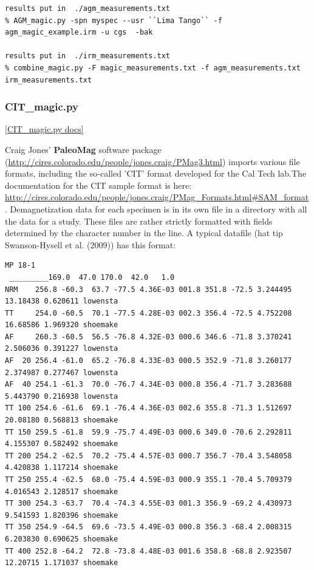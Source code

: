 \documentclass[11pt]{book}
\begin{document}
{{\begin{verbatim}
results put in  ./agm_measurements.txt
% AGM_magic.py -spn myspec --usr ``Lima Tango`` -f agm_magic_example.irm -u cgs  -bak

results put in  ./irm_measurements.txt
% combine_magic.py -F magic_measurements.txt -f agm_measurements.txt irm_measurements.txt

\end{verbatim}




\subsubsection{CIT\_magic.py}
\href{https://github.com/PmagPy/PmagPy/blob/master/programs/CIT_magic.py}{[CIT\_magic.py docs]}

 Craig Jones' {\bf PaleoMag} software package (\url{http://cires.colorado.edu/people/jones.craig/PMag3.html}) imports various file formats, including the so-called 'CIT' format developed for the  Cal Tech lab.The documentation for the CIT sample format is here: \url{http://cires.colorado.edu/people/jones.craig/PMag_Formats.html#SAM_format}.
 Demagnetization data for each specimen is in its own file in a directory with all the data for a study.
These files are rather strictly formatted with fields determined by the character number in the line.   A typical datafile (hat tip Swanson-Hysell et al. (2009)) \nocite{swansonhysell09} has this format:

\begin{verbatim}
MP 18-1
 _________169.0  47.0 170.0  42.0   1.0
NRM    256.8 -60.3  63.7 -77.5 4.36E-03 001.8 351.8 -72.5 3.244495 13.18438 0.620611 lowensta
TT     254.0 -60.5  70.1 -77.5 4.28E-03 002.3 356.4 -72.5 4.752208 16.68586 1.969320 shoemake
AF     260.3 -60.5  56.5 -76.8 4.32E-03 000.6 346.6 -71.8 3.370241 2.506036 0.391227 lowensta
AF  20 256.4 -61.0  65.2 -76.8 4.33E-03 000.5 352.9 -71.8 3.260177 2.374987 0.277467 lowensta
AF  40 254.1 -61.3  70.0 -76.7 4.34E-03 000.8 356.4 -71.7 3.283688 5.443790 0.216938 lowensta
TT 100 254.6 -61.6  69.1 -76.4 4.36E-03 002.6 355.8 -71.3 1.512697 20.08180 0.568813 shoemake
TT 150 259.5 -61.8  59.9 -75.7 4.49E-03 000.6 349.0 -70.6 2.292811 4.155307 0.582492 shoemake
TT 200 254.2 -62.5  70.2 -75.4 4.57E-03 000.7 356.7 -70.4 3.548058 4.420838 1.117214 shoemake
TT 250 255.4 -62.5  68.0 -75.4 4.59E-03 000.9 355.1 -70.4 5.709379 4.016543 2.128517 shoemake
TT 300 254.3 -63.7  70.4 -74.3 4.55E-03 001.3 356.9 -69.2 4.430973 9.541593 1.820396 shoemake
TT 350 254.9 -64.5  69.6 -73.5 4.49E-03 000.8 356.3 -68.4 2.008315 6.203830 0.690625 shoemake
TT 400 252.8 -64.2  72.8 -73.8 4.48E-03 001.6 358.8 -68.8 2.923507 12.20715 1.171037 shoemake
\end{verbatim}

}}
\end{document}
